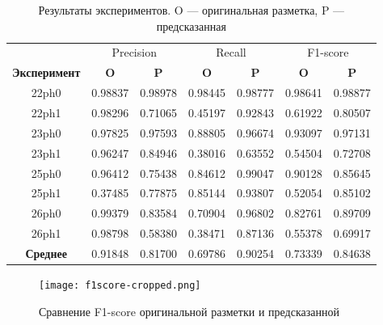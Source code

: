 \begin{table}[ht]
\centering
\label{tab:results}
	\begin{tabular}{ccccccc} \toprule
		& \multicolumn{2}{c}{Precision} & \multicolumn{2}{c}{Recall} & \multicolumn{2}{c}{F1-score} \\
		\textbf{Эксперимент}& \textbf{O} & \textbf{P}& \textbf{O} & \textbf{P}& \textbf{O} & \textbf{P} \\ \midrule
		22ph0               & 0.98837                & 0.98978               & 0.98445             & 0.98777            & 0.98641                  & 0.98877                  \\
		22ph1               & 0.98296                & 0.71065               & 0.45197             & 0.92843            & 0.61922                  & 0.80507                  \\
		23ph0               & 0.97825                & 0.97593               & 0.88805             & 0.96674            & 0.93097                  & 0.97131                  \\
		23ph1               & 0.96247                & 0.84946               & 0.38016             & 0.63552            & 0.54504                  & 0.72708                  \\
		25ph0               & 0.96412                & 0.75438               & 0.84612             & 0.99047            & 0.90128                  & 0.85645                  \\
		25ph1               & 0.37485                & 0.77875               & 0.85144             & 0.93807            & 0.52054                  & 0.85102                  \\
		26ph0               & 0.99379                & 0.83584               & 0.70904             & 0.96802            & 0.82761                  & 0.89709                  \\
		26ph1               & 0.98798                & 0.58380               & 0.38471             & 0.87136            & 0.55378                  & 0.69917                  \\ \midrule
		\textbf{Среднее}    & 0.91848                & 0.81700               & 0.69786             & 0.90254            & 0.73339                  & 0.84638                  \\ \bottomrule
	\end{tabular}
\caption{\centering Результаты экспериментов. O --- оригинальная разметка, P --- предсказанная}
\end{table}

\begin{figure}[!htb]
	\centering
	\texttt{[image: f1score-cropped.png]}
	\caption{Сравнение F1-score оригинальной разметки и предсказанной}
	\label{fig:f1score-vs}
\end{figure}

